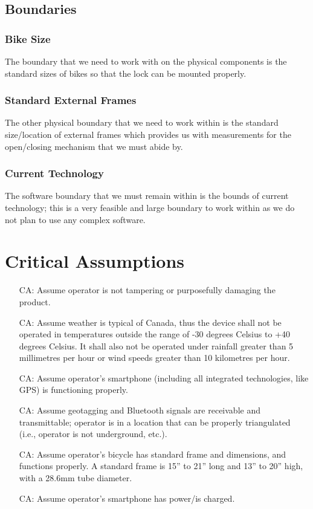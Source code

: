 \documentclass{article}
\newcounter{canum} %
\begin{document}
\subsection {Boundaries}
\subsubsection{Bike Size}
The boundary that we need to work with on the physical components is the standard sizes of bikes so that the lock can be mounted properly.
\subsubsection{Standard External Frames}
The other physical boundary that we need to work within is the standard size/location of external frames which provides us with measurements for the open/closing mechanism that we must abide by.
\subsubsection{Current Technology}
The software boundary that we must remain within is the bounds of current technology; this is a very feasible and large boundary to work within as we do not plan to use any complex software.

\section{Critical Assumptions}

\begin{itemize}

\item[CA\refstepcounter{canum}\thecanum\label{CA1}:] Assume operator is not tampering or purposefully damaging the product.
\item[CA\refstepcounter{canum}\thecanum\label{CA2}:] Assume weather is typical of Canada, thus the device shall not be operated in temperatures outside the range of -30 degrees Celsius to +40 degrees Celsius. It shall also not be operated under rainfall greater than 5 millimetres per hour or wind speeds greater than 10 kilometres per hour.
\item[CA\refstepcounter{canum}\thecanum\label{CA3}:] Assume operator's smartphone (including all integrated technologies, like GPS) is functioning properly.
\item[CA\refstepcounter{canum}\thecanum\label{CA4}:] Assume geotagging and Bluetooth signals are receivable and transmittable; operator is in a location that can be properly triangulated (i.e., operator is not underground, etc.). 
\item[CA\refstepcounter{canum}\thecanum\label{CA5}:] Assume operator's bicycle has standard frame and dimensions, and functions properly. A standard frame is 15'' to 21'' long and 13'' to 20'' high, with a 28.6mm tube diameter. 
\item[CA\refstepcounter{canum}\thecanum\label{CA6}:] Assume operator's smartphone has power/is charged. 

\end{itemize}
\end{document}
